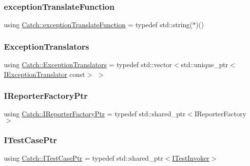 \subsubsection{\texorpdfstring{exception\+Translate\+Function}{exceptionTranslateFunction}}
{\footnotesize\ttfamily using \mbox{\hyperlink{namespace_catch_ae8d8673884dc36b98875106322a2a37b}{Catch\+::exception\+Translate\+Function}} = typedef std\+::string($\ast$)()}

\mbox{\label{namespace_catch_a7ad07967e688fdc03cf784f58be4b741}} 
\subsubsection{\texorpdfstring{Exception\+Translators}{ExceptionTranslators}}
{\footnotesize\ttfamily using \mbox{\hyperlink{namespace_catch_a7ad07967e688fdc03cf784f58be4b741}{Catch\+::\+Exception\+Translators}} = typedef std\+::vector$<$std\+::unique\+\_\+ptr$<$\mbox{\hyperlink{struct_catch_1_1_i_exception_translator}{I\+Exception\+Translator}} const$>$ $>$}

\mbox{\label{namespace_catch_ad1b36ac40c2739e52fd453dcdddf0d09}} 
\subsubsection{\texorpdfstring{I\+Reporter\+Factory\+Ptr}{IReporterFactoryPtr}}
{\footnotesize\ttfamily using \mbox{\hyperlink{namespace_catch_ad1b36ac40c2739e52fd453dcdddf0d09}{Catch\+::\+I\+Reporter\+Factory\+Ptr}} = typedef std\+::shared\+\_\+ptr$<$I\+Reporter\+Factory$>$}

\mbox{\label{namespace_catch_afa04ebe8e9423240c9585f7101a82ddf}} 
\subsubsection{\texorpdfstring{I\+Test\+Case\+Ptr}{ITestCasePtr}}
{\footnotesize\ttfamily using \mbox{\hyperlink{namespace_catch_afa04ebe8e9423240c9585f7101a82ddf}{Catch\+::\+I\+Test\+Case\+Ptr}} = typedef std\+::shared\+\_\+ptr$<$\mbox{\hyperlink{struct_catch_1_1_i_test_invoker}{I\+Test\+Invoker}}$>$}


